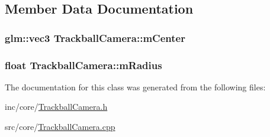 \subsection{Member Data Documentation}
\hypertarget{class_trackball_camera_aef9b92c4a1d08a88444e440e45638a57}{
\subsubsection[{m\+Center}]{\setlength{\rightskip}{0pt plus 5cm}glm\+::vec3 Trackball\+Camera\+::m\+Center\hspace{0.3cm}{\ttfamily [private]}}}\label{class_trackball_camera_aef9b92c4a1d08a88444e440e45638a57}
\hypertarget{class_trackball_camera_a73114de86526d04c3e04864e46e224e2}{
\subsubsection[{m\+Radius}]{\setlength{\rightskip}{0pt plus 5cm}float Trackball\+Camera\+::m\+Radius\hspace{0.3cm}{\ttfamily [private]}}}\label{class_trackball_camera_a73114de86526d04c3e04864e46e224e2}


The documentation for this class was generated from the following files\+:\begin{DoxyCompactItemize}
\item 
inc/core/\hyperlink{_trackball_camera_8h}{Trackball\+Camera.\+h}\item 
src/core/\hyperlink{_trackball_camera_8cpp}{Trackball\+Camera.\+cpp}\end{DoxyCompactItemize}
